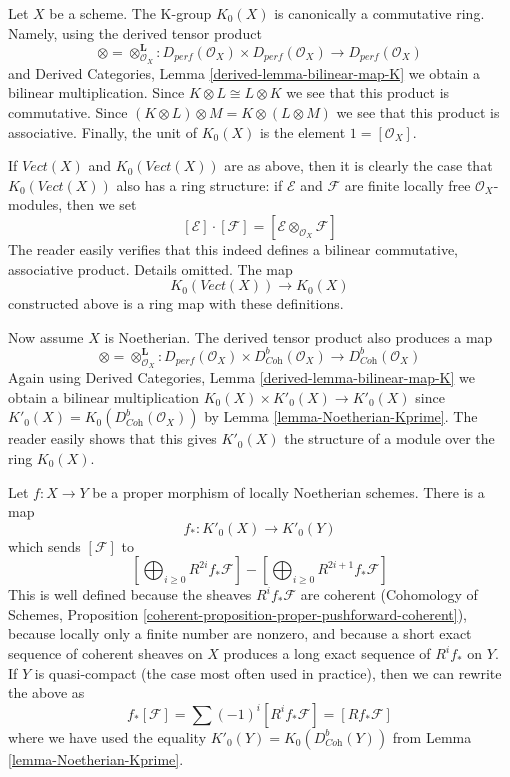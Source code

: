 \begin{remark}
\label{remark-K-ring}
Let $X$ be a scheme. The K-group $K_0(X)$ is canonically a commutative ring.
Namely, using the derived tensor product
$$
\otimes = \otimes^\mathbf{L}_{\mathcal{O}_X} :
D_{perf}(\mathcal{O}_X) \times D_{perf}(\mathcal{O}_X)
\longrightarrow
D_{perf}(\mathcal{O}_X)
$$
and Derived Categories, Lemma \ref{derived-lemma-bilinear-map-K}
we obtain a bilinear multiplication. Since $K \otimes L \cong L \otimes K$
we see that this product is commutative. Since
$(K \otimes L) \otimes M = K \otimes (L \otimes M)$
we see that this product is associative.
Finally, the unit of $K_0(X)$ is the element $1 = [\mathcal{O}_X]$.

\medskip\noindent
If $\textit{Vect}(X)$ and $K_0(\textit{Vect}(X))$ are as above, then
it is clearly the case that $K_0(\textit{Vect}(X))$ also has a
ring structure: if $\mathcal{E}$ and $\mathcal{F}$ are finite locally free
$\mathcal{O}_X$-modules, then we set
$$
[\mathcal{E}] \cdot [\mathcal{F}] =
[\mathcal{E} \otimes_{\mathcal{O}_X} \mathcal{F}]
$$
The reader easily verifies that this indeed defines a bilinear
commutative, associative product. Details omitted. The map
$$
K_0(\textit{Vect}(X)) \longrightarrow K_0(X)
$$
constructed above is a ring map with these definitions.

\medskip\noindent
Now assume $X$ is Noetherian. The derived tensor product also produces
a map
$$
\otimes = \otimes^\mathbf{L}_{\mathcal{O}_X} :
D_{perf}(\mathcal{O}_X) \times D^b_{\textit{Coh}}(\mathcal{O}_X)
\longrightarrow
D^b_{\textit{Coh}}(\mathcal{O}_X)
$$
Again using Derived Categories, Lemma \ref{derived-lemma-bilinear-map-K}
we obtain a bilinear multiplication $K_0(X) \times K'_0(X) \to K'_0(X)$
since $K'_0(X) = K_0(D^b_{\textit{Coh}}(\mathcal{O}_X))$ by
Lemma \ref{lemma-Noetherian-Kprime}.
The reader easily shows that this gives $K'_0(X)$ the structure
of a module over the ring $K_0(X)$.
\end{remark}

\begin{remark}
\label{remark-pushforward-K}
Let $f : X \to Y$ be a proper morphism of locally Noetherian schemes.
There is a map
$$
f_* : K'_0(X) \longrightarrow K'_0(Y)
$$
which sends $[\mathcal{F}]$ to
$$
[\bigoplus\nolimits_{i \geq 0} R^{2i}f_*\mathcal{F}] -
[\bigoplus\nolimits_{i \geq 0} R^{2i + 1}f_*\mathcal{F}]
$$
This is well defined because the sheaves $R^if_*\mathcal{F}$
are coherent (Cohomology of Schemes, Proposition
\ref{coherent-proposition-proper-pushforward-coherent}), because locally
only a finite number are nonzero, and because
a short exact sequence of coherent sheaves on $X$ produces a long
exact sequence of $R^if_*$ on $Y$. If $Y$ is quasi-compact (the
case most often used in practice), then we can rewrite the above as
$$
f_*[\mathcal{F}] = \sum (-1)^i[R^if_*\mathcal{F}] = [Rf_*\mathcal{F}]
$$
where we have used the equality $K'_0(Y) = K_0(D^b_{\textit{Coh}}(Y))$ from
Lemma \ref{lemma-Noetherian-Kprime}.
\end{remark}

